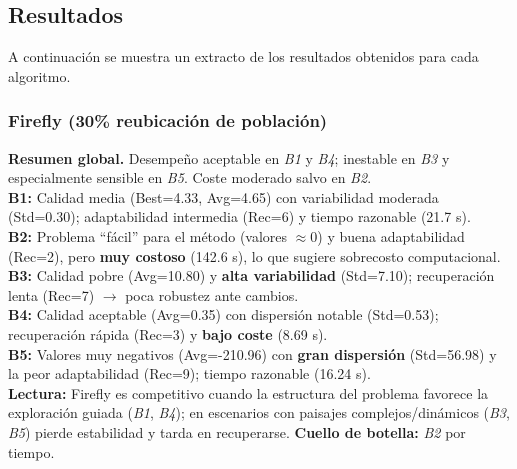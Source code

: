 \documentclass[10pt,twocolumn]{article}
\begin{document}
\subsection*{Resultados}

A continuación se muestra un extracto de los resultados obtenidos para cada algoritmo. 

\begin{table}[H]
\centering
\caption{Firefly (30\% reubicación de población): resultados promedios por benchmark.}
\label{tab:firefly}
\scriptsize
{}
\end{table}

\subsubsection*{Firefly (30\% reubicación de población)}
\textbf{Resumen global.} Desempeño aceptable en \textit{B1} y \textit{B4}; inestable en \textit{B3} y especialmente sensible en \textit{B5}. Coste moderado salvo en \textit{B2}. \\
\textbf{B1:} Calidad media (Best=4.33, Avg=4.65) con variabilidad moderada (Std=0.30); adaptabilidad intermedia (Rec=6) y tiempo razonable (21.7 s). \\
\textbf{B2:} Problema “fácil” para el método (valores $\approx 0$) y buena adaptabilidad (Rec=2), pero \textbf{muy costoso} (142.6 s), lo que sugiere sobrecosto computacional. \\
\textbf{B3:} Calidad pobre (Avg=10.80) y \textbf{alta variabilidad} (Std=7.10); recuperación lenta (Rec=7) $\rightarrow$ poca robustez ante cambios. \\
\textbf{B4:} Calidad aceptable (Avg=0.35) con dispersión notable (Std=0.53); recuperación rápida (Rec=3) y \textbf{bajo coste} (8.69 s). \\
\textbf{B5:} Valores muy negativos (Avg=-210.96) con \textbf{gran dispersión} (Std=56.98) y la peor adaptabilidad (Rec=9); tiempo razonable (16.24 s). \\
\textbf{Lectura:} Firefly es competitivo cuando la estructura del problema favorece la exploración guiada (\textit{B1}, \textit{B4}); en escenarios con paisajes complejos/dinámicos (\textit{B3}, \textit{B5}) pierde estabilidad y tarda en recuperarse. \textbf{Cuello de botella:} \textit{B2} por tiempo.
\end{document}
